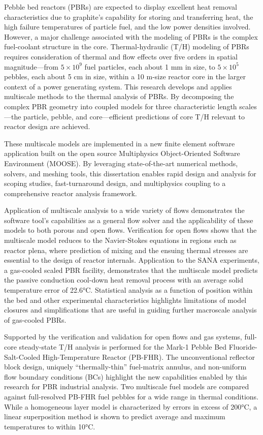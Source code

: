\documentclass{ucbthesis}
\newcommand{\mdash}
           {\discretionary{}{}{\kern 0.1em}---\discretionary{}{}{\kern 0.1em}}
\begin{document}
\noindent Pebble bed reactors (PBRs) are expected to display excellent heat removal characteristics due to graphite's capability for storing and transferring heat, the high failure temperatures of particle fuel, and the low power densities involved. However, a major challenge associated with the modeling of PBRs is the complex fuel-coolant structure in the core. Thermal-hydraulic (T/H) modeling of PBRs requires consideration of thermal and flow effects over five orders in spatial magnitude\mdash from \(5\times10^9\) fuel particles, each about 1 \si{\milli\meter} in size, to \(5\times10^5\) pebbles, each about 5 \si{\centi\meter} in size, within a 10 \si{\meter}-size reactor core in the larger context of a power generating system. This research develops and applies multiscale methods to the thermal analysis of PBRs. By decomposing the complex PBR geometry into coupled models for three characteristic length scales\mdash the particle, pebble, and core\mdash efficient predictions of core T/H relevant to reactor design are achieved.

These multiscale models are implemented in a new finite element software application built on the open source Multiphysics Object-Oriented Software Environment (MOOSE). By leveraging state-of-the-art numerical methods, solvers, and meshing tools, this dissertation enables rapid design and analysis for scoping studies, fast-turnaround design, and multiphysics coupling to a comprehensive reactor analysis framework. 

Application of multiscale analysis to a wide variety of flows demonstrates the software tool's capabilities as a general flow solver and the applicability of these models to both porous and open flows. Verification for open flows shows that the multiscale model reduces to the Navier-Stokes equations in regions such as reactor plena, where prediction of mixing and the ensuing thermal stresses are essential to the design of reactor internals. Application to the SANA experiments, a gas-cooled scaled PBR facility, demonstrates that the multiscale model predicts the passive conduction cool-down heat removal process with an average solid temperature error of 22.6\si{\celsius}. Statistical analysis as a function of position within the bed and other experimental characteristics highlights limitations of model closures and simplifications that are useful in guiding further macroscale analysis of gas-cooled PBRs.

Supported by the verification and validation for open flows and gas systems, full-core steady-state T/H analysis is performed for the Mark-1 Pebble Bed Fluoride-Salt-Cooled High-Temperature Reactor (PB-FHR). The unconventional reflector block design, uniquely ``thermally-thin'' fuel-matrix annulus, and non-uniform flow boundary conditions (BCs) highlight the new capabilities enabled by this research for PBR industrial analysis. Two multiscale fuel models are compared against full-resolved PB-FHR fuel pebbles for a wide range in thermal conditions. While a homogeneous layer model is characterized by errors in excess of 200\si{\celsius}, a linear superposition method is shown to predict average and maximum temperatures to within 10\si{\celsius}. 
\end{document}
